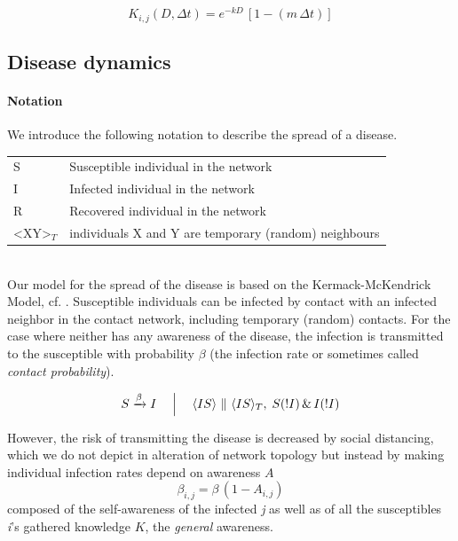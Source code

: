 \documentclass[11pt]{article}
\begin{document}
\begin{equation} \label{eq:cutoff}
 K_{i,j}(D,\Delta t) = e^{-k D} \, [ 1 - ( m \, \Delta t)]
\end{equation}

\subsection{Disease dynamics}
\paragraph*{Notation}
We introduce the following notation to describe the spread of a disease.

\begin{tabular}{l l}
\hline
S & Susceptible individual in the network \\
I & Infected individual in the network\\
R  & Recovered individual in the network \\
\textless XY\textgreater$ _{T}$ & individuals X and Y are temporary (random) neighbours \\
\hline
\end{tabular}\\

Our model for the spread of the disease is based on the Kermack-McKendrick Model, cf. \citep{Kermack}. Susceptible individuals can be infected by contact with an infected neighbor in the contact network, including temporary (random) contacts. For the case where neither has any awareness of the disease, the infection is transmitted to the susceptible with probability $ \beta$ (the infection rate or sometimes called {\it contact probability}).

\begin{equation}
S \xrightarrow\beta I  \quad  \Bigm| \quad \langle IS\rangle  ~\|~ \langle IS\rangle_{T},\;  S(!I)  \, \&\,  I(!I)
\end{equation}

However, the risk of transmitting the disease is decreased by social distancing, which we do not depict in alteration of network topology but instead by making individual infection rates depend on awareness $ A$
\begin{equation}
\beta_{i,j}=\beta \, (1-A_{i,j} )
\end{equation}
composed of the self-awareness of the infected \textit{j} as well as of all the susceptibles \textit{i}'s gathered knowledge $ K$, the {\it general} awareness.
\end{document}
